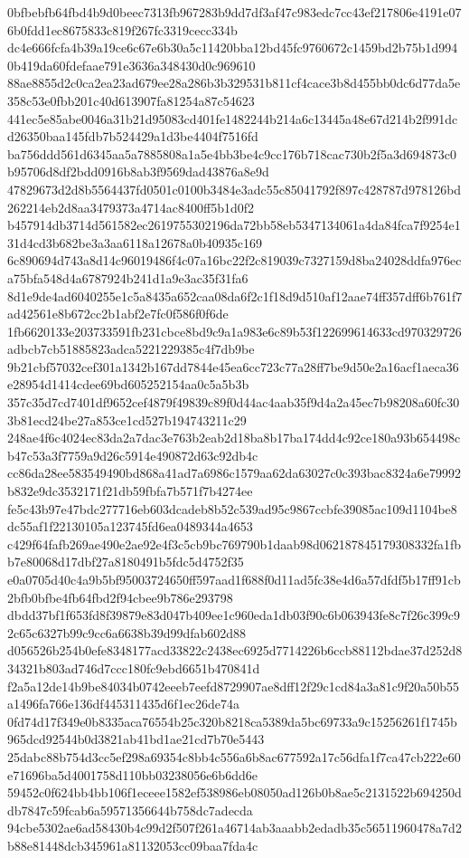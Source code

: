 \documentclass[11pt,a4paper]{article}
\begin{document}
{0bfbebfb64fbd4b9d0beec7313fb967283b9dd7df3af47c983edc7cc43ef217806e4191e076b0fdd1ec8675833c819f267fc3319cecc334b
dc4e666fcfa4b39a19ce6c67e6b30a5c11420bba12bd45fc9760672c1459bd2b75b1d9940b419da60fdefaae791e3636a348430d0c969610
88ae8855d2c0ca2ea23ad679ee28a286b3b329531b811cf4cace3b8d455bb0dc6d77da5e358c53e0fbb201c40d613907fa81254a87c54623
441ec5e85abe0046a31b21d95083cd401fe1482244b214a6c13445a48e67d214b2f991dcd26350baa145fdb7b524429a1d3be4404f7516fd
ba756ddd561d6345aa5a7885808a1a5e4bb3be4c9cc176b718cac730b2f5a3d694873c0b95706d8df2bdd0916b8ab3f9569dad43876a8e9d
47829673d2d8b5564437fd0501c0100b3484e3adc55c85041792f897c428787d978126bd262214eb2d8aa3479373a4714ac8400ff5b1d0f2
b457914db3714d561582ec2619755302196da72bb58eb5347134061a4da84fca7f9254e131d4cd3b682be3a3aa6118a12678a0b40935c169
6c890694d743a8d14c96019486f4c07a16bc22f2c819039c7327159d8ba24028ddfa976eca75bfa548d4a6787924b241d1a9e3ac35f31fa6
8d1e9de4ad6040255e1c5a8435a652caa08da6f2c1f18d9d510af12aae74ff357dff6b761f7ad42561e8b672cc2b1abf2e7fc0f586f0f6de
1fb6620133e203733591fb231cbce8bd9c9a1a983e6c89b53f122699614633cd970329726adbcb7cb51885823adca5221229385c4f7db9be
9b21cbf57032cef301a1342b167dd7844e45ea6cc723c77a28ff7be9d50e2a16acf1aeca36e28954d1414cdee69bd605252154aa0c5a5b3b
357c35d7cd7401df9652cef4879f49839c89f0d44ac4aab35f9d4a2a45ec7b98208a60fc303b81ecd24be27a853ce1cd527b194743211c29
248ae4f6c4024ec83da2a7dac3e763b2eab2d18ba8b17ba174dd4c92ce180a93b654498cb47c53a3f7759a9d26c5914e490872d63c92db4c
cc86da28ee583549490bd868a41ad7a6986c1579aa62da63027c0c393bac8324a6e79992b832e9dc3532171f21db59fbfa7b571f7b4274ee
fe5c43b97e47bdc277716eb603dcadeb8b52c539ad95c9867ccbfe39085ac109d1104be8dc55af1f22130105a123745fd6ea0489344a4653
c429f64fafb269ae490e2ae92e4f3c5cb9bc769790b1daab98d062187845179308332fa1fbb7e80068d17dbf27a8180491b5fdc5d4752f35
e0a0705d40c4a9b5bf95003724650ff597aad1f688f0d11ad5fc38e4d6a57dfdf5b17ff91cb2bfb0bfbe4fb64fbd2f94cbee9b786e293798
dbdd37bf1f653fd8f39879e83d047b409ee1c960eda1db03f90c6b063943fe8c7f26c399c92c65c6327b99c9cc6a6638b39d99dfab602d88
d056526b254b0efe8348177acd33822c2438ec6925d7714226b6ccb88112bdae37d252d834321b803ad746d7ccc180fc9ebd6651b470841d
f2a5a12de14b9be84034b0742eeeb7eefd8729907ae8dff12f29c1cd84a3a81c9f20a50b55a1496fa766e136df445311435d6f1ec26de74a
0fd74d17f349e0b8335aca76554b25c320b8218ca5389da5bc69733a9c15256261f1745b965dcd92544b0d3821ab41bd1ae21cd7b70e5443
25dabc88b754d3cc5ef298a69354c8bb4c556a6b8ac677592a17c56dfa1f7ca47cb222e60e71696ba5d4001758d110bb03238056e6b6dd6e
59452c0f624bb4bb106f1eceee1582ef538986eb08050ad126b0b8ae5c2131522b694250ddb7847c59fcab6a59571356644b758dc7adecda
94cbe5302ae6ad58430b4c99d2f507f261a46714ab3aaabb2edadb35c56511960478a7d2b88e81448dcb345961a81132053cc09baa7fda4c
}
\end{document}
